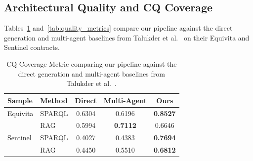 \documentclass[sigconf]{acmart}
\begin{document}
\subsection{Architectural Quality and CQ Coverage}

Tables~\ref{tab:cq_coverage} and~\ref{tab:quality_metrics} compare our pipeline against the direct generation and multi-agent baselines from Talukder et al.~\cite{talukder2026towards} on their Equivita and Sentinel contracts.


\begin{table}[t]
\centering\small
\setlength{\tabcolsep}{8pt}
\caption{\normalfont CQ Coverage Metric comparing our pipeline against the direct generation and multi-agent baselines from Talukder et al.~\cite{talukder2026towards}.}
\label{tab:cq_coverage}
\begin{tabular}{llccc}
\toprule
\textbf{Sample} & \textbf{Method} & \textbf{Direct} & \textbf{Multi-Agent} & \textbf{Ours} \\
\midrule
Equivita & SPARQL & 0.6304 & 0.6196 & \textbf{0.8527} \\
         & RAG              & 0.5994 & \textbf{0.7112} & 0.6646 \\
\midrule
Sentinel & SPARQL & 0.4027 & 0.4383 & \textbf{0.7694} \\
         & RAG              & 0.4450 & 0.5510 & \textbf{0.6812} \\
\bottomrule
\end{tabular}
\end{table}
\end{document}
